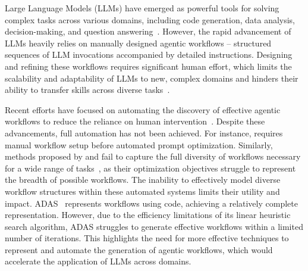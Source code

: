 \documentclass{article} %
\theoremstyle{plain}
\theoremstyle{definition}
\theoremstyle{remark}
\begin{document}



Large Language Models (LLMs) have emerged as powerful tools for solving complex tasks across various domains, including code generation, data analysis, decision-making, and question answering~\citep{DBLP:journals/corr/abs-2408-05109, bo2024nlsql, DBLP:journals/corr/abs-2406-07815, yu2024hai, sun2024chatbot, wangchain, song2023llm, xietravelplanner, li2024debug}. However, the rapid advancement of LLMs heavily relies on manually designed agentic workflows -- structured sequences of LLM invocations accompanied by detailed instructions. Designing and refining these workflows requires significant human effort, which limits the scalability and adaptability of LLMs to new, complex domains and hinders their ability to transfer skills across diverse tasks~\citep{DBLP:conf/cidr/0001YF0LH24}.

Recent efforts have focused on automating the discovery of effective agentic workflows to reduce the reliance on human intervention~\citep{omar2024dspy, mert2024text,liu2023dynamic,hu2024automated}. Despite these advancements, full automation has not been achieved. For instance, \citet{omar2024dspy} requires manual workflow setup before automated prompt optimization. Similarly, methods proposed by \citet{mert2024text} and \citet{zhuge2024gptswarm} fail to capture the full diversity of workflows necessary for a wide range of tasks~\citep{yu2023thought, yang2024buffer, sun2023indeterminacy}, as their optimization objectives struggle to represent the breadth of possible workflows. The inability to effectively model diverse workflow structures within these automated systems limits their utility and impact.
ADAS~\citep{hu2024automated} represents workflows using code, achieving a relatively complete representation. However, due to the efficiency limitations of its linear heuristic search algorithm, ADAS struggles to generate effective workflows within a limited number of iterations. This highlights the need for more effective techniques to represent and automate the generation of agentic workflows, which would accelerate the application of LLMs across domains.
\end{document}

